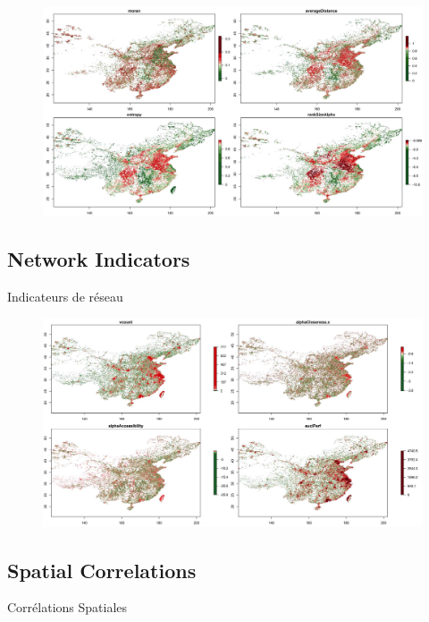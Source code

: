 \begin{figure}
\includegraphics[width=\linewidth]{Figures/Final/A-staticcorrelations-morphocn.jpg}
\label{fig:app:staticcorrelations:morphocn}
\end{figure}


\subsection{Network Indicators}{Indicateurs de réseau}


\begin{figure}
\includegraphics[width=\linewidth]{Figures/Final/A-staticcorrelations-networkcn.jpg}
\label{fig:app:staticcorrelations:networkcn}
\end{figure}



\subsection{Spatial Correlations}{Corrélations Spatiales}

